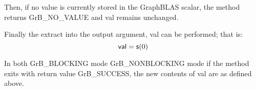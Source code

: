 Then, if no value is currently stored in the GraphBLAS scalar, the method returns
{\sf GrB\_NO\_VALUE} and {\sf val} remains unchanged. 

Finally the extract into the output argument, {\sf val} can be performed;  
that is:
\[
    {\sf val} = {\sf s}(0)
\]

In both {\sf GrB\_BLOCKING} mode {\sf GrB\_NONBLOCKING} mode
if the method exits with return value {\sf GrB\_SUCCESS}, the  new 
contents of {\sf val} are as defined above.  


